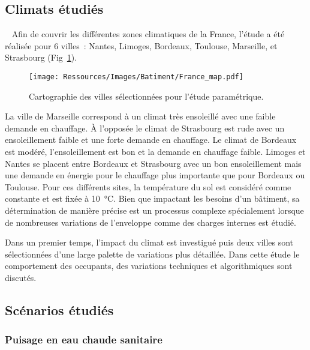 \subsection{Climats étudiés} %
\label{sub:climats_etudies}
~
Afin de couvrir les différentes zones climatiques de la France, l’étude a été réalisée
pour 6 villes~: Nantes, Limoges, Bordeaux, Toulouse, Marseille, et Strasbourg (Fig~\ref{fig:carte_france}).
\begin{figure}
    \begin{center}
        \texttt{[image: Ressources/Images/Batiment/France\_map.pdf]}
    \end{center}
    \caption{Cartographie des villes sélectionnées pour l’étude paramétrique.
             \label{fig:carte_france}}
\end{figure}
La ville de Marseille correspond à un climat très ensoleillé avec une faible demande
en chauffage. À l’opposée le climat de Strasbourg est rude avec un ensoleillement faible
et une forte demande en chauffage. Le climat de Bordeaux est modéré, l’ensoleillement
est bon et la demande en chauffage faible. Limoges et Nantes se placent entre Bordeaux et Strasbourg
avec un bon ensoleillement mais une demande en énergie pour le chauffage plus importante
que pour Bordeaux ou Toulouse.
Pour ces différents sites, la température du sol est considéré comme constante et
est fixée à \SI{10}{\celsius}. Bien que impactant les besoins
d’un bâtiment, sa détermination de manière précise est un processus complexe
spécialement lorsque de nombreuses variations de l’enveloppe comme des charges internes
est étudié.




Dans un premier temps, l’impact du climat est investigué puis deux villes sont
sélectionnées d’une large palette de variations plus détaillée. Dans cette
étude le comportement des occupants, des variations techniques et algorithmiques sont
discutés.


\subsection{Scénarios étudiés} %
\label{sub:scenarios_etudies}
\subsubsection{Puisage en eau chaude sanitaire} %
\label{ssub:puisage_en_eau_chaude_sanitaire}

